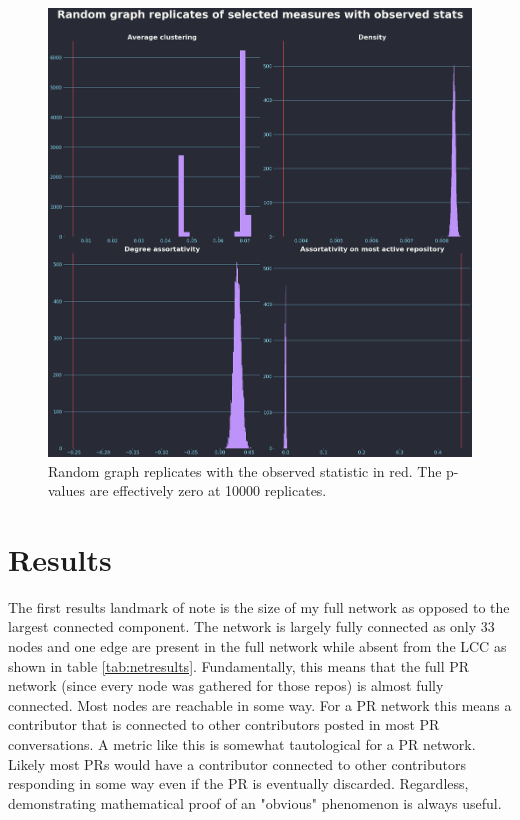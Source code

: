 \documentclass[12pt, a4paper]{article}
\begin{document}
\begin{figure}
    \includegraphics[width=\linewidth]{metrics_dist_w_obs.png}
    \caption{Random graph replicates with the observed statistic in red. The p-values are effectively zero at 10000 replicates.}
    \label{fig:metricswobs}
\end{figure}

\section{Results}
The first results landmark of note is the size of my full network as opposed to the largest connected component. The network is largely fully connected as only 33 nodes and one edge are present in the full network while absent from the LCC as shown in table \ref{tab:netresults}. Fundamentally, this means that the full PR network (since every node was gathered for those repos) is almost fully connected. Most nodes are reachable in some way. For a PR network this means a contributor that is connected to other contributors posted in most PR conversations. A metric like this is somewhat tautological for a PR network. Likely most PRs would have a contributor connected to other contributors responding in some way even if the PR is eventually discarded. Regardless, demonstrating mathematical proof of an "obvious" phenomenon is always useful.
\end{document}
